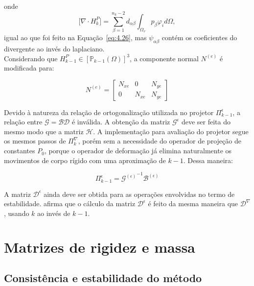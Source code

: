     \noindent onde $$\bigl[\nabla\cdot H_k^P\bigr] = \sum_{\beta=1}^{n_k-2} d_{\alpha\beta}  \int_{\Omega_v} p_\beta \varphi_i d\Omega,$$ igual ao que foi feito na Equação~\ref{eq:4.26}, mas $\psi_{\alpha\beta}$ contém os coeficientes do divergente ao invés do laplaciano.\\
    \indent Considerando que $H_{k-1}^P \in \left[\mathbb{P}_{k-1}(\Omega) \right]^3$, a componente normal $N^{(e)}$ é modificada para:

    \begin{equation}
        N^{(e)} = \begin{bmatrix} N_{xe} & 0 & N_{ye} \\ 0 & N_{xe}  & N_{ye} \end{bmatrix} 
        \label{eq:4.50}
    \end{equation}  

    \indent Devido à natureza da relação de ortogonalização utilizada no projetor $\Pi_{k-1}^\epsilon$, a relação entre $\mathcal{G} = \mathcal{B}\mathcal{D}$ é inválida. A obtenção da matriz $\mathcal{G}^{\epsilon}$ deve ser feita do mesmo modo que a matriz $\mathcal{H}$.  A implementação para avaliação do projetor segue os mesmos passos de $\Pi_k^\nabla$, porém sem a necessidade do operador de projeção de constantes $P_0$, porque o operador de deformação já elimina naturalmente os movimentos de corpo rígido com uma aproximação de $k-1$. Dessa maneira:
    
    \begin{equation}
        \Pi_{k-1}^\epsilon = {\mathcal{G}^{(\epsilon)}}^{-1} \mathcal{B}^{(\epsilon)}
        \label{eq:4.51}
    \end{equation}

    \indent A matriz $\mathcal{D}^{\epsilon}$ ainda deve ser obtida para as operações envolvidas no termo de estabilidade. \citet{arbitraryorder2dvirtualelementspolygonalmeshespartelasticproblem2017a} afirma que o cálculo da matriz $\mathcal{D}^{\epsilon}$ é feito da mesma maneira que $\mathcal{D}^{\nabla}$, usando $k$ ao invés de $k-1$. 

\section{Matrizes de rigidez e massa}

\subsection{Consistência e estabilidade do método}

